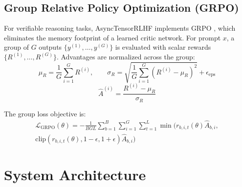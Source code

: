 \documentclass[10pt,twocolumn,letterpaper]{article}
\begin{document}
\subsection{Group Relative Policy Optimization (GRPO)}

For verifiable reasoning tasks, AsyncTensorRLHF implements GRPO \cite{shao2024deepseekmath, deepseek2025r1}, which eliminates the memory footprint of a learned critic network. For prompt $x$, a group of $G$ outputs $\{y^{(1)}, \dots, y^{(G)}\}$ is evaluated with scalar rewards $\{R^{(1)}, \dots, R^{(G)}\}$. Advantages are normalized across the group:
\begin{equation}
    \mu_R = \frac{1}{G} \sum_{i=1}^G R^{(i)}, \qquad \sigma_R = \sqrt{\frac{1}{G} \sum_{i=1}^G (R^{(i)} - \mu_R)^2} + \epsilon_{\text{eps}}
\end{equation}
\begin{equation}
    \hat{A}^{(i)} = \frac{R^{(i)} - \mu_R}{\sigma_R}
\end{equation}

The group loss objective is:
\begin{equation}
\begin{split}
    \mathcal{L}_{\text{GRPO}}(\theta) = -\frac{1}{B G L} \sum_{b=1}^B \sum_{i=1}^G \sum_{t=1}^L \min\Big( r_{b,i,t}(\theta) \hat{A}_{b,i}, \\
    \text{clip}(r_{b,i,t}(\theta), 1-\epsilon, 1+\epsilon) \hat{A}_{b,i} \Big)
\end{split}
\end{equation}

\section{System Architecture}
\end{document}
